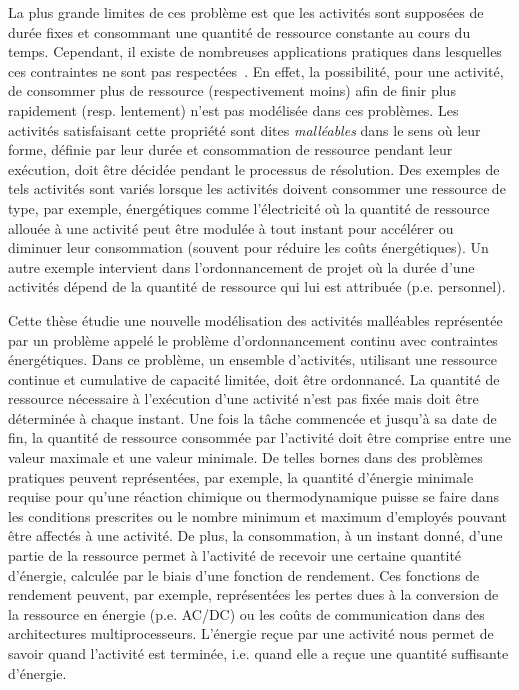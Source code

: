 La plus grande limites de ces problème est que les activités sont
supposées de durée fixes et consommant une quantité de ressource
constante au cours du temps. Cependant, il existe de nombreuses
applications pratiques dans lesquelles ces contraintes ne sont pas
respectées~\cite{HaitArtiguesLopez,Blaz,W80}. En effet, la
possibilité, pour une activité, de consommer plus de ressource
(respectivement moins) afin de finir plus rapidement (resp. lentement)
n'est pas modélisée dans ces problèmes. Les activités satisfaisant
cette propriété sont dites {\it malléables} dans le sens où leur
forme, définie par leur durée et consommation de ressource pendant
leur exécution, doit être décidée pendant le processus de
résolution. Des exemples de tels activités sont variés lorsque les
activités doivent consommer une ressource de type, par
exemple, énergétiques comme l'électricité où la quantité de ressource
allouée à une activité peut être modulée à tout instant pour accélérer
ou diminuer leur consommation (souvent pour réduire les coûts
énergétiques). Un autre exemple intervient dans l'ordonnancement de
projet où la durée d'une activités dépend de la quantité de ressource
qui lui est attribuée (p.e. personnel). 

Cette thèse étudie une nouvelle modélisation des activités malléables
représentée par un problème appelé le problème d'ordonnancement
continu avec contraintes énergétiques. Dans ce problème, un ensemble
d'activités,  utilisant une ressource continue et cumulative de
capacité limitée, doit être ordonnancé. La quantité de ressource
nécessaire à l'exécution d'une activité n'est pas fixée mais doit
être déterminée à chaque instant. Une fois la tâche commencée et
jusqu'à sa date de fin, la quantité de ressource consommée par
l'activité doit être comprise entre une valeur maximale et une valeur
minimale. De telles bornes dans des problèmes pratiques
peuvent représentées, par exemple, la quantité d'énergie
minimale requise pour qu'une réaction chimique ou thermodynamique
puisse se faire dans les conditions prescrites ou le nombre minimum et
maximum d'employés pouvant être affectés à une activité.
De plus, la consommation, à un instant donné, d'une partie
de la ressource permet à l'activité de recevoir une certaine quantité
d'énergie, calculée par le biais d'une fonction de rendement. Ces
fonctions de rendement peuvent, par exemple, représentées les pertes
dues à la conversion de la ressource en énergie (p.e. AC/DC) ou les
coûts de communication dans des architectures multiprocesseurs. 
L'énergie reçue par une activité nous permet de savoir quand
l'activité est terminée, i.e. quand elle a reçue une quantité
suffisante d'énergie.  

